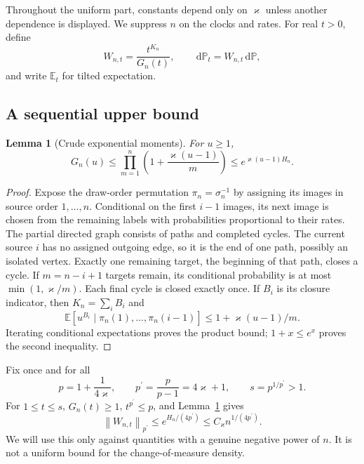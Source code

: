 \documentclass[11pt]{article}
\numberwithin{equation}{section}
\newtheorem{lemma}[theorem]{Lemma}
\theoremstyle{definition}
\theoremstyle{remark}
\newcommand{\E}{\mathbb E}
\newcommand{\Pp}{\mathbb P}
\newcommand{\dd}{\,\mathrm d}
\newcommand{\pdual}{{p^{\prime}}}
\newcommand{\norm}[1]{\left\|#1\right\|}
\begin{document}
Throughout the uniform part, constants depend only on $\varkappa$ unless another dependence is displayed. We suppress $n$ on the clocks and rates. For real $t>0$, define
\begin{equation}\label{eq:tilt}
 W_{n,t}=\frac{t^{K_n}}{G_n(t)},\qquad
 \dd\Pp_t=W_{n,t}\dd\Pp,
\end{equation}
and write $\E_t$ for tilted expectation.

\subsection{A sequential upper bound}
\begin{lemma}[Crude exponential moments]\label{lem:crude-mgf}
For $u\ge1$,
\begin{equation}\label{eq:crude-mgf}
 G_n(u)\le\prod_{m=1}^n\left(1+\frac{\varkappa(u-1)}m\right)
 \le e^{\varkappa(u-1)H_n}.
\end{equation}
\end{lemma}
\begin{proof}
Expose the draw-order permutation $\pi_n=\sigma_n^{-1}$ by assigning its images in source order $1,\ldots,n$. Conditional on the first $i-1$ images, its next image is chosen from the remaining labels with probabilities proportional to their rates. The partial directed graph consists of paths and completed cycles. The current source $i$ has no assigned outgoing edge, so it is the end of one path, possibly an isolated vertex. Exactly one remaining target, the beginning of that path, closes a cycle. If $m=n-i+1$ targets remain, its conditional probability is at most $\min(1,\varkappa/m)$. Each final cycle is closed exactly once. If $B_i$ is its closure indicator, then $K_n=\sum_iB_i$ and
\[
 \E[u^{B_i}\mid\pi_n(1),\ldots,\pi_n(i-1)]
 \le1+\varkappa(u-1)/m.
\]
Iterating conditional expectations proves the product bound; $1+x\le e^x$ proves the second inequality.
\end{proof}

Fix once and for all
\begin{equation}\label{eq:exponents}
 p=1+\frac1{4\varkappa},\qquad \pdual=\frac p{p-1}=4\varkappa+1,
 \qquad s=p^{1/\pdual}>1.
\end{equation}
For $1\le t\le s$, $G_n(t)\ge1$, $t^\pdual\le p$, and Lemma~\ref{lem:crude-mgf} gives
\begin{equation}\label{eq:weight-norm}
 \norm{W_{n,t}}_\pdual\le e^{H_n/(4\pdual)}\le C_\varkappa n^{1/(4\pdual)}.
\end{equation}
We will use this only against quantities with a genuine negative power of $n$. It is not a uniform bound for the change-of-measure density.
\end{document}
